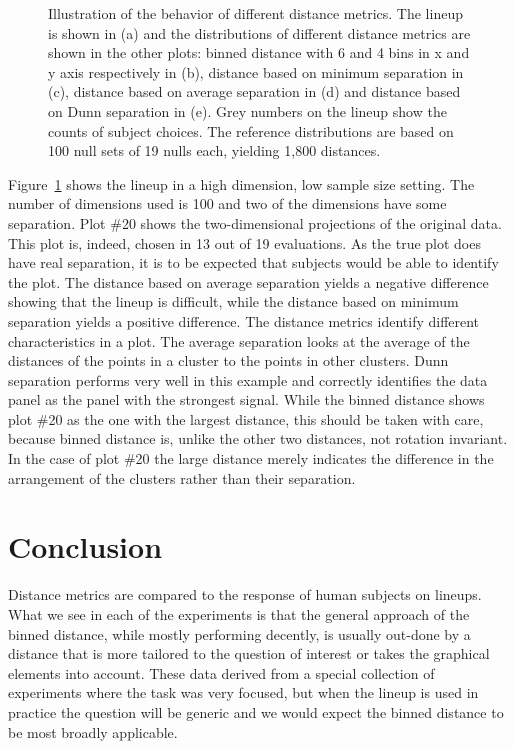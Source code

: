 \documentclass[12pt]{article}\usepackage[]{graphicx}\usepackage[]{color}
\newenvironment{knitrout}{}{} %
\begin{document}
\begin{figure}[!p]
\begin{subfigure}[t]{\textwidth}
\begin{subfigure}[t]{0.3\textwidth}
\begin{knitrout}
\end{knitrout}
\end{subfigure} 
\end{subfigure}
	\vspace{-.1in}
\caption{Illustration of the behavior of different distance metrics. The lineup is shown in (a) and the distributions of different distance metrics are shown in the other plots:  binned distance with 6 and 4 bins in x and y axis respectively in (b), distance based on minimum separation in (c), distance based on average separation in (d) and distance based on Dunn separation in (e). Grey numbers on the lineup show the counts of subject choices. The reference distributions are based on 100 null sets of 19 nulls each, yielding 1,800 distances.}
\label{lp-exp}
\end{figure}

Figure~\ref{lp-exp} shows the lineup in a high dimension, low sample size setting. The number of dimensions used is 100 and two of the dimensions have some separation. Plot \#20 shows the two-dimensional projections of the original data. This plot is, indeed, chosen in 13 out of 19 evaluations.  As the true plot does have real separation, it is to be expected that  subjects would be able to identify the plot. The distance based on average separation yields a negative difference showing that the lineup is difficult, while the distance based on minimum separation yields a positive difference. The distance metrics identify different characteristics in a plot. The average separation looks at the average of the distances of the points in a cluster to the points in other clusters.  Dunn separation performs very well in this example and correctly identifies the data panel as the panel with the strongest signal. While the binned distance shows plot \#20 as the one with the largest distance, this should be taken with care, because binned distance is, unlike the other two distances, not rotation invariant. In the case of plot \#20 the large distance merely indicates the difference in the arrangement of the clusters rather than their separation.


\section{Conclusion}
Distance metrics are compared to the response of human subjects on lineups. What we see in each of the experiments is that the general approach of the binned distance, while mostly performing decently, is usually out-done by a distance that is more tailored to the question of interest or takes the graphical elements into account. These data derived from a special collection of experiments where the task was very focused, but when the lineup is used in practice the question will be generic and we would expect the binned distance to be most broadly applicable. 
\end{document}
